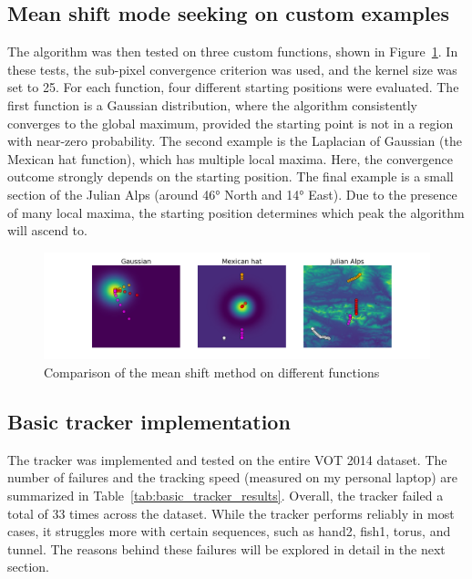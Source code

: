 \documentclass[9pt]{IEEEtran}
\begin{document}
\subsection{Mean shift mode seeking on custom examples}
The algorithm was then tested on three custom functions, shown in 
Figure~\ref{fig:mode_seeking2}. In these tests, the sub-pixel convergence criterion
 was used, and the kernel size was set to 25. For each function, four different 
 starting positions were evaluated. The first function is a Gaussian distribution, 
 where the algorithm consistently converges to the global maximum, provided the 
 starting point is not in a region with near-zero probability. The second example 
 is the Laplacian of Gaussian (the Mexican hat function), which has multiple local
  maxima. Here, the convergence outcome strongly depends on the starting position.
   The final example is a small section of the Julian Alps (around 46° North and 
   14° East). Due to the presence of many local maxima, the starting position 
   determines which peak the algorithm will ascend to. 

\begin{figure}[h]
  \centering
  \includegraphics[width=0.99\columnwidth]{figures/mode_seeking2.png}
  \caption{Comparison of the mean shift method on different functions}
  \label{fig:mode_seeking2}
\end{figure}

\subsection{Basic tracker implementation}
The tracker was implemented and tested on the entire VOT 2014 dataset. 
The number of failures and the tracking speed (measured on my personal laptop)
 are summarized in Table~\ref{tab:basic_tracker_results}. Overall, the tracker 
 failed a total of 33 times across the dataset. While the tracker performs reliably
  in most cases, it struggles more with certain sequences, such as hand2, fish1,
   torus, and tunnel. The reasons behind these failures will be explored in detail in the next section. 
\end{document}
